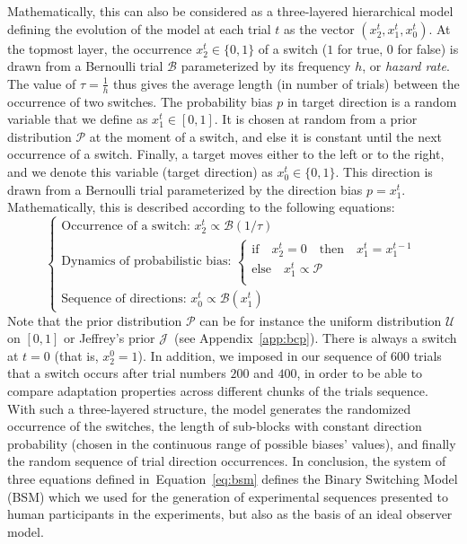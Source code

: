 \documentclass[12pt,english]{article}%
\newcommand{\choice}[1]{ %
	\left\{ %
		\begin{array}{l} #1 \end{array} %
	\right. }
\newcommand{\eql}[1]{\begin{equation}#1\end{equation}}
\newcommand{\Bb}{\mathcal{B}}
\newcommand{\Jj}{\mathcal{J}}
\newcommand{\Pp}{\mathcal{P}}
\newcommand{\Uu}{\mathcal{U}}
\newcommand{\seeFig}[1]{Figure~\ref{fig:#1}}
\newcommand{\seeEq}[1]{Equation~\ref{eq:#1}}
\newcommand{\seeApp}[1]{Appendix~\ref{app:#1}}
\begin{document}
Mathematically, this can also be considered as a three-layered hierarchical model
defining the evolution of the model at each trial $t$ as the vector  $(x_2^t, x_1^t, x_0^t)$.
At the topmost layer,
the occurrence $x_2^t \in \{ 0, 1 \}$ of a switch ($1$ for true, $0$ for false)
is  drawn from a Bernoulli trial $\Bb$ parameterized by its frequency $h$, or \emph{hazard rate}.
The value of $\tau=\frac 1 h$ thus gives the average length (in number of trials)
between the occurrence of two switches.
The probability bias $p$ in target direction is a random variable that we define as $x_1^t \in [0, 1]$.
It is chosen at random from a prior distribution $\Pp$ at the moment of a switch,
and else it is constant until the next occurrence of a switch.
Finally, a target moves either to the left or to the right,
and we denote this variable (target direction) as $x_0^t \in \{ 0, 1 \}$.
This direction is drawn from a Bernoulli trial
parameterized by the direction bias $p=x_1^t$.
Mathematically, this is  described according to the following equations:
 \eql{\choice{
\text{Occurrence of a switch: } x_2^t \propto \Bb(1/\tau) \\
\text{Dynamics of probabilistic bias: } 
 \choice{\text{if} \quad x_2^t=0 \quad \text{then} \quad  x_1^t = x_1^{t-1} \\
 \text{else} \quad x_1^t \propto \Pp  \\
 } \\
\text{Sequence of directions: } x_0^t \propto \Bb(x_1^t)
 }\label{eq:bsm}}
Note that the prior distribution $\Pp$ can be for instance
the uniform distribution $\Uu$ on $ [ 0, 1 ] $ or
Jeffrey's prior $\Jj$~(see \seeApp{bcp}).
There is always a switch at $t=0$ (that is, $x_2^0=1$). 
In addition, we imposed in our sequence of $600$ trials that a switch 
occurs after trial numbers $200$ and $400$, 
in order to be able to compare adaptation properties across different chunks of the trials sequence.
With such a three-layered structure, the model generates the randomized occurrence of the switches,
the length of sub-blocks with constant direction probability
(chosen in the continuous range of possible biases' values), 
and finally the random sequence of trial direction occurrences.
In conclusion, the system of three equations defined in~\seeEq{bsm}
defines the Binary Switching Model (BSM)
which we used for the generation of experimental sequences presented to human participants in the experiments,
but also as the basis of an ideal observer model.
\end{document}
